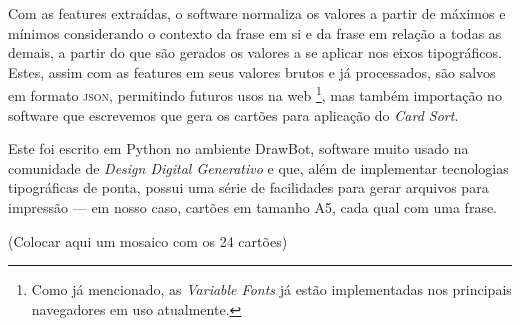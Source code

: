 \documentclass[a4paper,11pt,titlepage,singlespacing]{article}
\let\svthefootnote\thefootnote
\newcommand\Cfootnote[2][black]{\def\thefootnote{\color{#1}\svthefootnote}%
  \footnote{\color{#1}#2}}
\begin{document}
{    Com as features extraídas, o software normaliza os valores a partir de máximos e mínimos considerando o contexto da frase em si e da frase em relação a todas as demais, a partir do que são gerados os valores a se aplicar nos eixos tipográficos. Estes, assim com as features em seus valores brutos e já processados, são salvos em formato \textsc{json}, permitindo futuros usos na web\Cfootnote[pos_parecer]{Como já mencionado, as \textit{Variable Fonts} já estão implementadas nos principais navegadores em uso atualmente.}, mas também importação no software que escrevemos que gera os cartões para aplicação do \textit{Card Sort}.
    
    Este foi escrito em Python no ambiente DrawBot, software muito usado na comunidade de \textit{Design Digital Generativo} e que, além de implementar tecnologias tipográficas de ponta, possui uma série de facilidades para gerar arquivos para impressão — em nosso caso, cartões em tamanho A5, cada qual com uma frase.
    
    (Colocar aqui um mosaico com os 24 cartões)
    
}




\pagebreak


\end{document}
